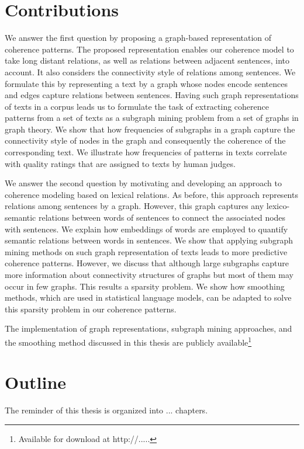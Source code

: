 \section{Contributions}
\label{sec:intro-contributions}

We answer the first question by proposing a graph-based representation of coherence patterns. 
The proposed representation enables our coherence model to take long distant relations, as well as relations between adjacent sentences,  into account. 
It also considers the connectivity style of relations among sentences. 
We formulate this by representing a text by a graph whose nodes encode sentences and edges capture relations between sentences. 
Having such graph representations of texts in a corpus leads us to formulate the task of extracting coherence patterns from a set of texts as a subgraph mining problem from a set of graphs in graph theory. 
We show that how frequencies of subgraphs in a graph capture the connectivity style of nodes in the graph and consequently the coherence of the corresponding text. 
We illustrate how frequencies of patterns in texts correlate with quality ratings that are assigned to texts by human judges. 

We answer the second question by motivating and developing an approach to coherence modeling based on lexical relations. 
As before, this approach represents relations among sentences by a graph. 
However, this graph captures any lexico-semantic relations between words of sentences to connect the associated nodes with sentences. 
We explain how embeddings of words are employed to quantify semantic relations between words in sentences. 
We show that applying subgraph mining methods on such graph representation of texts leads to more predictive coherence patterns. 
However, we discuss that although large subgraphs capture more information about connectivity structures of graphs but most of them may occur in few graphs. 
This results a sparsity problem. 
We show how smoothing methods, which are used in statistical language models, can be adapted to solve this sparsity problem in our coherence patterns. 

The implementation of graph representations, subgraph mining approaches, and the smoothing method discussed in this thesis are publicly available\footnote{Available for download at http://.....} 


\section{Outline}
\label{sec:intro-outline}
The reminder of this thesis is organized into ... chapters. 

